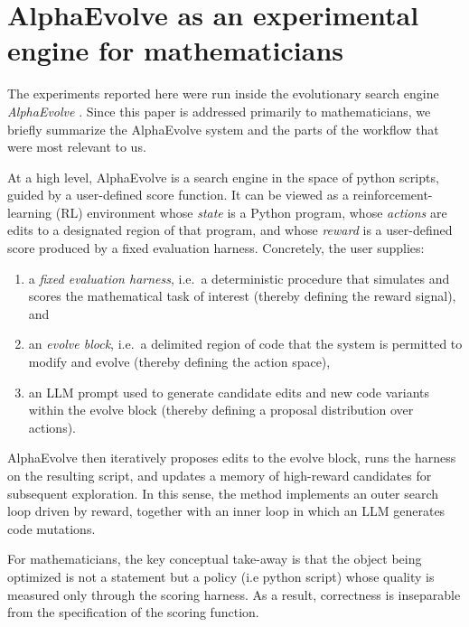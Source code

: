 \documentclass[11pt]{amsart}
\begin{document}
\section*{AlphaEvolve as an experimental engine for mathematicians}
\label{sec:alphaevolve}

The experiments reported here were run inside the evolutionary search engine \emph{AlphaEvolve} \cite{NovikovEtAl2025AlphaEvolve,AlphaEvolve2025Scale}.
Since this paper is addressed primarily to mathematicians, we briefly summarize the AlphaEvolve system and the parts of the workflow that were most relevant to us. 

At a high level, AlphaEvolve is a search engine in the space of python scripts, guided by a user-defined score function.
It can be viewed as a reinforcement-learning (RL) environment whose \emph{state} is a Python program, whose \emph{actions} are edits to a designated region of that program,
and whose \emph{reward} is a user-defined score produced by a fixed evaluation harness.
Concretely, the user supplies:
\begin{enumerate}[label=(\roman*)]
    \item a \emph{fixed evaluation harness}, i.e.\ a deterministic procedure that simulates and scores the mathematical task of interest (thereby defining the reward signal), and
    \item an \emph{evolve block}, i.e.\ a delimited region of code that the system is permitted to modify and evolve (thereby defining the action space),
    \item an LLM prompt used to generate candidate edits and new code variants within the evolve block (thereby defining a proposal distribution over actions).
\end{enumerate}
AlphaEvolve then iteratively proposes edits to the evolve block, runs the harness on the resulting script, and updates a memory of high-reward candidates for subsequent exploration.
In this sense, the method implements an outer search loop driven by reward, together with an inner loop in which an LLM generates code mutations.

For mathematicians, the key conceptual take-away is that the object being optimized is not a statement but a policy (i.e python script) whose quality is measured only through the scoring harness.
As a result, correctness is inseparable from the specification of the scoring function.
\end{document}

